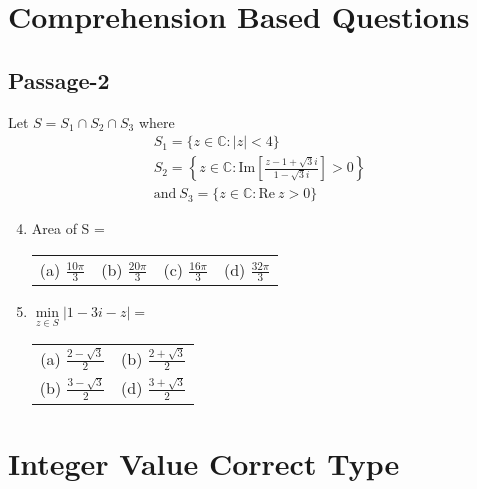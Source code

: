 \documentclass[journal,12pt,twocolumn]{IEEEtran}
\theoremstyle{remark}
\newcommand{\RE}{\mathrm{Re}}
\newcommand{\IM}{\mathrm{Im}}
\begin{document}
\section*{Comprehension Based Questions}
\subsection*{Passage-2}

Let $S = S_1 \cap S_2 \cap S_3$ where
\begin{gather*}
	S_1 = \{z \in \mathbb C: |z| < 4 \} \\
	S_2 = \left\{z \in \mathbb C: \IM\left[ \frac {z - 1 + \sqrt 3 i} {1 - \sqrt 3 i} \right] > 0 \right\} \\
	\text{and} \ S_3 = \{z \in \mathbb C: \RE\ z > 0\}
\end{gather*}

\begin{enumerate}[label=\arabic*)]
		\setcounter{enumi}{3}
	\item Area of S = 
		\hspace*{\fill} {\color{magenta}} \\

		\begin{tabular}{ c c c c }
			(a) $\frac {10\pi} 3$ & (b) $\frac {20\pi} 3$ & (c) $\frac {16\pi} 3$ & (d) $\frac {32\pi} 3$
		\end{tabular}

		\vspace{5mm}

	\item $\min\limits_{z \in S} |1 - 3i - z| = $
		\hspace*{\fill} {\color{magenta}} \\

		\begin{tabular}{ c c }
			(a) $\frac {2 - \sqrt 3} 2$ & (b) $\frac {2 + \sqrt 3} 2$ \\
			(b) $\frac {3 -\sqrt 3} 2$ & (d) $\frac {3 + \sqrt 3} 2$
		\end{tabular}
\end{enumerate}

\section*{Integer Value Correct Type}
\end{document}
